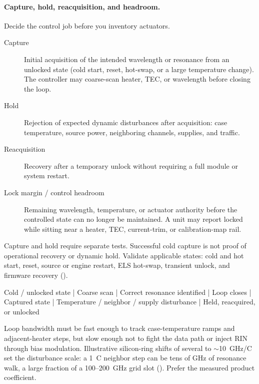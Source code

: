 \paragraph{Capture, hold, reacquisition, and headroom.}
Decide the control job before you inventory actuators.
\begin{description}
\item[Capture] Initial acquisition of the intended wavelength or resonance from
      an unlocked state (cold start, reset, hot-swap, or a large temperature
      change). The controller may coarse-scan heater, TEC, or wavelength before
      closing the loop.
\item[Hold] Rejection of expected dynamic disturbances after acquisition: case
      temperature, source power, neighboring channels, supplies, and traffic.
\item[Reacquisition] Recovery after a temporary unlock without requiring a full
      module or system restart.
\item[Lock margin / control headroom] Remaining wavelength, temperature, or
      actuator authority before the controlled state can no longer be maintained.
      A unit may report locked while sitting near a heater, TEC, current-trim, or
      calibration-map rail.
\end{description}

Capture and hold require separate tests. Successful cold capture is not proof of
operational recovery or dynamic hold. Validate applicable states: cold and hot
start, reset, source or engine restart, ELS hot-swap, transient unlock, and
firmware recovery ().

\begin{dectree}
Cold / unlocked state
  |
Coarse scan
  |
Correct resonance identified
  |
Loop closes
  |
Captured state
  |
Temperature / neighbor / supply disturbance
  |
Held, reacquired, or unlocked
\end{dectree}

Loop bandwidth must be fast enough to track case-temperature ramps and
adjacent-heater steps, but slow enough not to fight the data path or inject RIN
through bias modulation. Illustrative silicon-ring shifts of several to
$\sim$10~GHz/\textdegree C set the disturbance scale: a 1~\textdegree C neighbor
step can be tens of GHz of resonance walk, a large fraction of a 100--200~GHz
grid slot (). Prefer the measured product coefficient.

